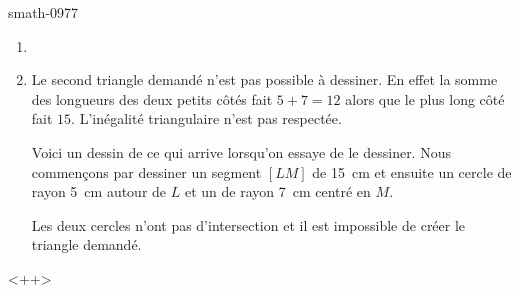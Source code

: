 
\begin{corrige}{smath-0977}

    \begin{enumerate}
        \item
        \item
            Le second triangle demandé n'est pas possible à dessiner. En effet la somme des longueurs des deux petits côtés fait \( 5+7=12\) alors que le plus long côté fait \( 15\). L'inégalité triangulaire n'est pas respectée.

            Voici un dessin de ce qui arrive lorsqu'on essaye de le dessiner. Nous commençons par dessiner un segment \( [LM]\) de \SI{15}{\centi\meter} et ensuite un cercle de rayon \SI{5}{\centi\meter} autour de \( L\) et un de rayon \SI{7}{\centi\meter} centré en \( M\).

\begin{center}
   
\end{center}
    Les deux cercles n'ont pas d'intersection et il est impossible de créer le triangle demandé.
    

    \end{enumerate}
    <++>

\end{corrige}
